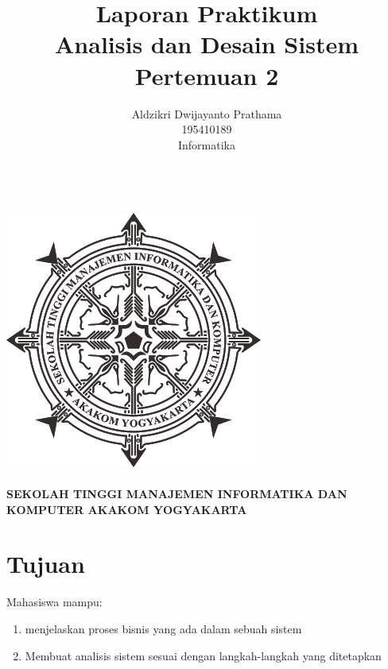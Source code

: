 \documentclass[a4paper,12pt]{article}
\begin{document}
\title{ {\Large Laporan Praktikum}\\ Analisis dan Desain Sistem\\{\Large Pertemuan 2}}

\author{Aldzikri Dwijayanto Prathama
    \\195410189
    \\Informatika}
\makeatletter
\begin{titlepage}
    \begin{center}
        {\huge \bfseries \@title}\\[14ex]
        \includegraphics[scale=.8]{logo}\\[4ex]
        {\large \@author}\\[12ex]
        {\large \bfseries {SEKOLAH TINGGI MANAJEMEN INFORMATIKA DAN KOMPUTER
            AKAKOM YOGYAKARTA}}
    \end{center}


\end{titlepage}
\makeatother
\newpage
\tableofcontents
\newpage

\section{Tujuan}
Mahasiswa mampu:
\begin{enumerate}
   \item menjelaskan proses bisnis yang ada dalam sebuah sistem
   \item Membuat analisis sistem sesuai dengan langkah-langkah yang ditetapkan
\end{enumerate}
\end{document}
